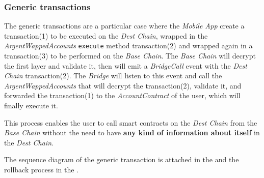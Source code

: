 \subsubsection{Generic transactions}
\label{subsubsec:generic_transactions}

The generic transactions are a particular case where the \textit{Mobile App} create a transaction(1) to be executed on the \textit{Dest Chain}, wrapped in the \textit{ArgentWappedAccounts} \texttt{execute} method transaction(2) and wrapped again in a transaction(3) to be performed on the \textit{Base Chain}. The \textit{Base Chain} will decrypt the first layer and validate it, then will emit a \textit{BridgeCall} event with the \textit{Dest Chain} transaction(2). The \textit{Bridge} will listen to this event and call the \textit{ArgentWappedAccounts} that will decrypt the transaction(2), validate it, and forwarded the transaction(1) to the \textit{AccountContract} of the user, which will finally execute it. 

This process enables the user to call smart contracts on the \textit{Dest Chain} from the \textit{Base Chain} without the need to have \textbf{any kind of information about itself} in the \textit{Dest Chain}. 

The sequence diagram of the generic transaction is attached in the  and the rollback process in the .